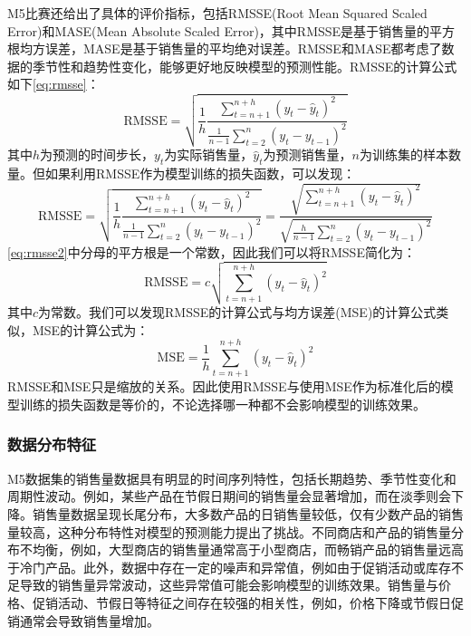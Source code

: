 \documentclass[12pt]{article}
\begin{document}
M5比赛还给出了具体的评价指标，包括RMSSE(Root Mean Squared Scaled Error)和MASE(Mean Absolute Scaled Error)，其中RMSSE是基于销售量的平方根均方误差，MASE是基于销售量的平均绝对误差。RMSSE和MASE都考虑了数据的季节性和趋势性变化，能够更好地反映模型的预测性能。RMSSE的计算公式如下\ref{eq:rmsse}：
\begin{equation}
    \text{RMSSE} = \sqrt{\frac{1}{h} \frac{\sum_{t=n+1}^{n+h} (y_t - \hat{y}_t)^2}{\frac{1}{n-1} \sum_{t=2}^{n} (y_t - y_{t-1})^2}}
    \label{eq:rmsse}
\end{equation}
其中$h$为预测的时间步长，$y_t$为实际销售量，$\hat{y}_t$为预测销售量，$n$为训练集的样本数量。但如果利用RMSSE作为模型训练的损失函数，可以发现：
\begin{equation}
    \text{RMSSE} = \sqrt{\frac{1}{h} \frac{\sum_{t=n+1}^{n+h} (y_t - \hat{y}_t)^2}{\frac{1}{n-1} \sum_{t=2}^{n} (y_t - y_{t-1})^2}} =  \frac{\sqrt{\sum_{t=n+1}^{n+h} (y_t - \hat{y}_t)^2}}{\sqrt{\frac{h}{n-1} \sum_{t=2}^{n} (y_t - y_{t-1})^2}}
    \label{eq:rmsse2}
\end{equation}
\ref{eq:rmsse2}中分母的平方根是一个常数，因此我们可以将RMSSE简化为：
\begin{equation}
    \text{RMSSE} = c \sqrt{\sum_{t=n+1}^{n+h} (y_t - \hat{y}_t)^2}
    \label{eq:rmsse3}
\end{equation}
其中$c$为常数。我们可以发现RMSSE的计算公式与均方误差(MSE)的计算公式类似，MSE的计算公式为：
\begin{equation}
    \text{MSE} = \frac{1}{h} \sum_{t=n+1}^{n+h} (y_t - \hat{y}_t)^2
    \label{eq:mse}
\end{equation}
RMSSE和MSE只是缩放的关系。因此使用RMSSE与使用MSE作为标准化后的模型训练的损失函数是等价的，不论选择哪一种都不会影响模型的训练效果。

\subsubsection*{数据分布特征}
M5数据集的销售量数据具有明显的时间序列特性，包括长期趋势、季节性变化和周期性波动。例如，某些产品在节假日期间的销售量会显著增加，而在淡季则会下降。销售量数据呈现长尾分布，大多数产品的日销售量较低，仅有少数产品的销售量较高，这种分布特性对模型的预测能力提出了挑战。不同商店和产品的销售量分布不均衡，例如，大型商店的销售量通常高于小型商店，而畅销产品的销售量远高于冷门产品。此外，数据中存在一定的噪声和异常值，例如由于促销活动或库存不足导致的销售量异常波动，这些异常值可能会影响模型的训练效果。销售量与价格、促销活动、节假日等特征之间存在较强的相关性，例如，价格下降或节假日促销通常会导致销售量增加。
\end{document}
